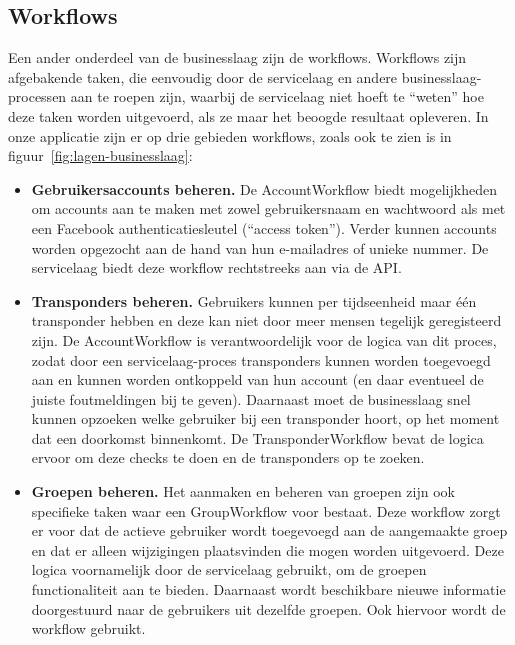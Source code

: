 \subsection{Workflows}

Een ander onderdeel van de businesslaag zijn de workflows. Workflows zijn afgebakende taken, 
die eenvoudig door de servicelaag en andere businesslaag-processen aan te roepen zijn, waarbij de servicelaag niet hoeft te ``weten'' hoe deze taken worden uitgevoerd, als ze maar het beoogde resultaat opleveren. In onze applicatie zijn er op drie gebieden workflows, zoals ook te zien is in figuur~\ref{fig:lagen-businesslaag}:

\begin{itemize}
	\item{\textbf{Gebruikersaccounts beheren.}} 
	De AccountWorkflow biedt mogelijkheden om accounts aan te maken met zowel gebruikersnaam en wachtwoord als met een Facebook authenticatiesleutel (``access token''). Verder kunnen accounts worden opgezocht aan de hand van hun e-mailadres of unieke nummer. De servicelaag biedt deze workflow rechtstreeks aan via de API.

	\item{\textbf{Transponders beheren.}} 
	Gebruikers kunnen per tijdseenheid maar één transponder hebben en deze kan niet door meer mensen tegelijk geregisteerd zijn. De AccountWorkflow is verantwoordelijk voor de logica van dit proces, zodat door een servicelaag-proces transponders kunnen worden toegevoegd aan en kunnen worden ontkoppeld van hun account (en daar eventueel de juiste foutmeldingen bij te geven). Daarnaast moet de businesslaag snel kunnen opzoeken welke gebruiker bij een transponder hoort, op het moment dat een doorkomst binnenkomt. De TransponderWorkflow bevat de logica ervoor om deze checks te doen en de transponders op te zoeken.

	\item{\textbf{Groepen beheren.}} 
	Het aanmaken en beheren van groepen zijn ook specifieke taken waar een GroupWorkflow voor bestaat. Deze workflow zorgt er voor dat de actieve gebruiker wordt toegevoegd aan de aangemaakte groep en dat er alleen wijzigingen plaatsvinden die mogen worden uitgevoerd. Deze logica voornamelijk door de servicelaag gebruikt, om de groepen functionaliteit aan te bieden. Daarnaast wordt beschikbare nieuwe informatie doorgestuurd naar de gebruikers uit dezelfde groepen. Ook hiervoor wordt de workflow gebruikt.

\end{itemize}